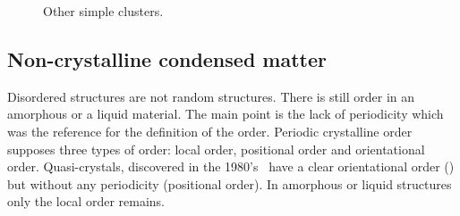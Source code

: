 \begin{figure}
	\ContinuedFloat
	\centering
	\caption{Other simple clusters.}
	\label{fig:other_clusters}
\end{figure}

\subsection{Non-crystalline condensed matter}

Disordered structures are not random structures. There is still order in an amorphous or a liquid material. The main point is the lack of periodicity which was the reference for the definition of the order. Periodic crystalline order supposes three types of order: local order, positional order and orientational order. Quasi-crystals, discovered in the 1980's~\citep{Shechtman1984} have a clear orientational order () but without any periodicity (positional order). In amorphous or liquid structures only the local order remains.

